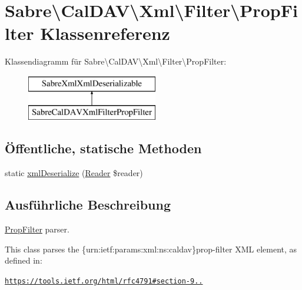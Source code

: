 \hypertarget{class_sabre_1_1_cal_d_a_v_1_1_xml_1_1_filter_1_1_prop_filter}{}\section{Sabre\textbackslash{}Cal\+D\+AV\textbackslash{}Xml\textbackslash{}Filter\textbackslash{}Prop\+Filter Klassenreferenz}
\label{class_sabre_1_1_cal_d_a_v_1_1_xml_1_1_filter_1_1_prop_filter}
Klassendiagramm für Sabre\textbackslash{}Cal\+D\+AV\textbackslash{}Xml\textbackslash{}Filter\textbackslash{}Prop\+Filter\+:\begin{figure}[H]
\begin{center}
\leavevmode
\includegraphics[height=2.000000cm]{class_sabre_1_1_cal_d_a_v_1_1_xml_1_1_filter_1_1_prop_filter}
\end{center}
\end{figure}
\subsection*{Öffentliche, statische Methoden}
\begin{DoxyCompactItemize}
\item 
static \mbox{\hyperlink{class_sabre_1_1_cal_d_a_v_1_1_xml_1_1_filter_1_1_prop_filter_adb11581e4195decbf52f2132dc7f2c83}{xml\+Deserialize}} (\mbox{\hyperlink{class_sabre_1_1_xml_1_1_reader}{Reader}} \$reader)
\end{DoxyCompactItemize}


\subsection{Ausführliche Beschreibung}
\mbox{\hyperlink{class_sabre_1_1_cal_d_a_v_1_1_xml_1_1_filter_1_1_prop_filter}{Prop\+Filter}} parser.

This class parses the \{urn\+:ietf\+:params\+:xml\+:ns\+:caldav\}prop-\/filter X\+ML element, as defined in\+:

\href{https://tools.ietf.org/html/rfc4791#section-9.7.2}{\tt https\+://tools.\+ietf.\+org/html/rfc4791\#section-\/9..}

